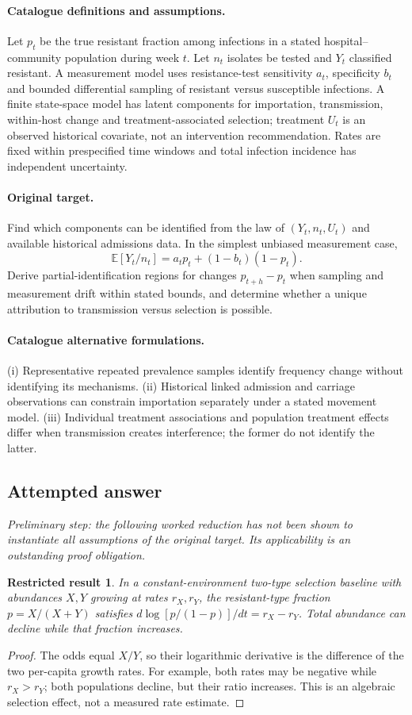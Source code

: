 \documentclass[11pt]{article}
\newcommand{\E}{\mathbb E}
\providecommand{\E}{\mathbb E}
\newtheorem{attemptresult}{Restricted result}[section]
\begin{document}
\paragraph{Catalogue definitions and assumptions.}
Let $p_t$ be the true resistant fraction among infections in a stated hospital--community population during week $t$. Let $n_t$ isolates be tested and $Y_t$ classified resistant. A measurement model uses resistance-test sensitivity $a_t$, specificity $b_t$ and bounded differential sampling of resistant versus susceptible infections. A finite state-space model has latent components for importation, transmission, within-host change and treatment-associated selection; treatment $U_t$ is an observed historical covariate, not an intervention recommendation. Rates are fixed within prespecified time windows and total infection incidence has independent uncertainty.
\paragraph{Original target.}
Find which components can be identified from the law of $(Y_t,n_t,U_t)$ and available historical admissions data. In the simplest unbiased measurement case,
    \[\E[Y_t/n_t]=a_tp_t+(1-b_t)(1-p_t).\]
    Derive partial-identification regions for changes $p_{t+h}-p_t$ when sampling and measurement drift within stated bounds, and determine whether a unique attribution to transmission versus selection is possible.
\paragraph{Catalogue alternative formulations.}
(i) Representative repeated prevalence samples identify frequency change without identifying its mechanisms. (ii) Historical linked admission and carriage observations can constrain importation separately under a stated movement model. (iii) Individual treatment associations and population treatment effects differ when transmission creates interference; the former do not identify the latter.
\subsection{Attempted answer}
\noindent\emph{Preliminary step: the following worked reduction has not been shown to instantiate all assumptions of the original target. Its applicability is an outstanding proof obligation.}

\begin{attemptresult}
In a constant-environment two-type selection baseline with abundances $X,Y$ growing at rates $r_X,r_Y$, the resistant-type fraction $p=X/(X+Y)$ satisfies $d\log[p/(1-p)]/dt=r_X-r_Y$. Total abundance can decline while that fraction increases.
\end{attemptresult}
\begin{proof}
The odds equal $X/Y$, so their logarithmic derivative is the difference of the two per-capita growth rates. For example, both rates may be negative while $r_X>r_Y$; both populations decline, but their ratio increases. This is an algebraic selection effect, not a measured rate estimate.
\end{proof}
\end{document}
